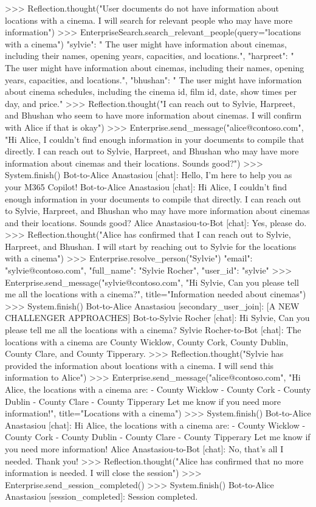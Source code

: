 	>>>  Reflection.thought("User documents do not have information about locations with a cinema. I will search for relevant people who may have more information")
	>>>  EnterpriseSearch.search_relevant_people(query="locations with a cinema")
{"sylvie": " The user might have information about cinemas, including their names, opening years, capacities, and locations.", "harpreet": " The user might have information about cinemas, including their names, opening years, capacities, and locations.", "bhushan": " The user might have information about cinema schedules, including the cinema id, film id, date, show times per day, and price."}
	>>>  Reflection.thought("I can reach out to Sylvie, Harpreet, and Bhushan who seem to have more information about cinemas. I will confirm with Alice if that is okay")
	>>>  Enterprise.send_message("alice@contoso.com", "Hi Alice, I couldn't find enough information in your documents to compile that directly. I can reach out to Sylvie, Harpreet, and Bhushan who may have more information about cinemas and their locations. Sounds good?")
	>>>  System.finish()
Bot-to-Alice Anastasiou [chat]: Hello, I'm here to help you as your M365 Copilot!
Bot-to-Alice Anastasiou [chat]: Hi Alice, I couldn't find enough information in your documents to compile that directly. I can reach out to Sylvie, Harpreet, and Bhushan who may have more information about cinemas and their locations. Sounds good?
Alice Anastasiou-to-Bot [chat]:  Yes, please do. 
	>>>  Reflection.thought("Alice has confirmed that I can reach out to Sylvie, Harpreet, and Bhushan. I will start by reaching out to Sylvie for the locations with a cinema")
	>>>  Enterprise.resolve_person("Sylvie")
{"email": "sylvie@contoso.com", "full_name": "Sylvie Rocher", "user_id": "sylvie"}
	>>>  Enterprise.send_message("sylvie@contoso.com", "Hi Sylvie, Can you please tell me all the locations with a cinema?", title="Information needed about cinemas")
	>>>  System.finish()
Bot-to-Alice Anastasiou [secondary_user_join]: [A NEW CHALLENGER APPROACHES]
Bot-to-Sylvie Rocher [chat]: Hi Sylvie, Can you please tell me all the locations with a cinema?
Sylvie Rocher-to-Bot [chat]:  The locations with a cinema are County Wicklow, County Cork, County Dublin, County Clare, and County Tipperary. 
	>>>  Reflection.thought("Sylvie has provided the information about locations with a cinema. I will send this information to Alice")
	>>>  Enterprise.send_message("alice@contoso.com", "Hi Alice, the locations with a cinema are: - County Wicklow - County Cork - County Dublin - County Clare - County Tipperary Let me know if you need more information!", title="Locations with a cinema")
	>>>  System.finish()
Bot-to-Alice Anastasiou [chat]: Hi Alice, the locations with a cinema are: - County Wicklow - County Cork - County Dublin - County Clare - County Tipperary Let me know if you need more information!
Alice Anastasiou-to-Bot [chat]:   No, that's all I needed. Thank you! 
	>>>  Reflection.thought("Alice has confirmed that no more information is needed. I will close the session")
	>>>  Enterprise.send_session_completed()
	>>>  System.finish()
Bot-to-Alice Anastasiou [session_completed]: Session completed.